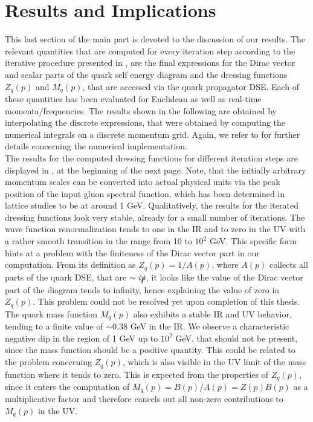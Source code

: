 \section{Results and Implications}
This last section of the main part is devoted to the discussion of our results. The relevant quantities that are computed for every iteration step according to the iterative procedure presented in , are the final expressions for the Dirac vector and scalar parts of the quark self energy diagram and the dressing functions $Z_q(p)$ and $M_q(p)$, that are accessed via the quark propagator DSE. Each of these quantities has been evaluated for Euclidean as well as real-time momenta/frequencies. The results shown in the following are obtained by interpolating the discrete expressions, that were obtained by computing the numerical integrals on a discrete momentum grid. Again, we refer to  for further details concerning the numerical implementation. \\The results for the computed  dressing functions for different iteration steps are displayed in , at the beginning of the next page. Note, that the initially arbitrary momentum scales can be converted into actual physical units via the peak position of the input gluon spectral function, which has been determined in lattice studies to be at around 1 GeV. 
 Qualitatively, the results for the iterated dressing functions look very stable, already for a small number of iterations. The wave function renormalization tends to one in the IR and to zero in the UV with a rather smooth transition in the range from 10 to $10^2$ GeV. This specific form hints at a problem with the finiteness of the Dirac vector part in our computation. From its definition as $Z_q(p)=1/A(p)$, where $A(p)$ collects all parts of the quark DSE, that are $\sim i\slashed{p}$, it looks like the value of the Dirac vector part of the diagram tends to infinity, hence explaining the value of zero in $Z_q(p)$.  This problem could not be resolved yet upon completion of this thesis.\\
The quark mass function $M_q(p)$ also exhibits a stable IR and UV behavior, tending to a finite value of $\sim 0.38$ GeV in the IR. We observe a characteristic negative dip in the region of 1 GeV up to $10^2$ GeV, that should not be present, since the mass function should be a positive quantity. This could be related to the problem concerning $Z_q(p)$, which is also visible in the UV limit of the mass function where it tends to zero. This is expected from the properties of $Z_q(p)$, since it enters the computation of $M_q(p)=B(p)/A(p)=Z(p)B(p)$ as a multiplicative factor and therefore cancels out all non-zero contributions to $M_q(p)$ in the UV.

